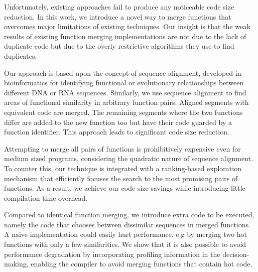 Unfortunately, existing approaches fail  to produce any noticeable code size reduction.
In this work, we introduce a novel way to merge functions that overcomes major limitations of existing techniques.
Our insight is that the weak results of existing function merging implementations are not due to the lack of duplicate code but due to the %
overly restrictive algorithms they use to find duplicates.


Our approach is based upon the concept of sequence alignment, developed in bioinformatics for identifying functional or evolutionary relationships between different DNA or RNA sequences.
Similarly, we use sequence alignment to find areas of functional similarity in arbitrary function pairs.
Aligned segments with equivalent code are merged.
The remaining segments where the two functions differ are added to the new function too but have their code guarded by a function identifier.
This approach leads to significant code size reduction.

Attempting to merge all pairs of functions is prohibitively expensive even for medium sized programs, considering the quadratic nature of sequence alignment.
To counter this, our technique is integrated with a ranking-based exploration mechanism that efficiently focuses the search to the most
promising pairs of functions. %
As a result, we achieve our code size savings while introducing little compilation-time
overhead.

Compared to identical function merging, we introduce extra code to be executed,
namely the code that chooses between dissimilar sequences in merged functions.
A naive implementation could easily hurt performance, e.g by merging two hot functions
with only a few similarities.
We show that it is also possible to avoid performance degradation by incorporating
profiling information in the decision-making, enabling the compiler to avoid merging functions that contain hot code.

